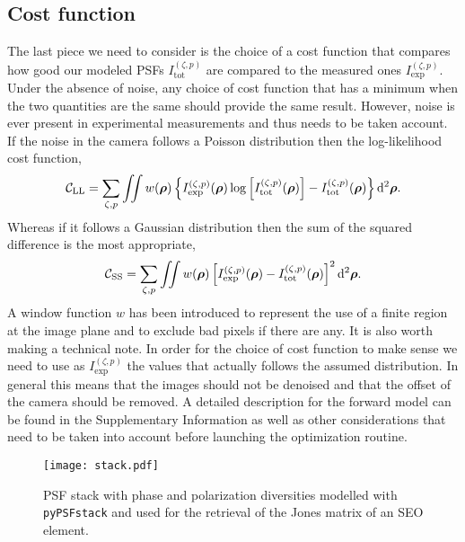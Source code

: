 \documentclass[reprint,aps,pra,superscriptaddress,
amsmath,amssymb]{revtex4-1}
\begin{document}
\subsection{Cost function}

The last piece we need to consider is the choice of a cost function that 
compares how good our modeled PSFs $I^{(\zeta ,p)}_\text{tot}$
are compared to the measured ones $I^{(\zeta ,p)}_\text{exp}$.
Under the absence of noise, any choice of cost function that has a minimum 
when the two quantities are the same should provide the same result. However,
noise is ever present in experimental measurements and thus needs to be taken
account. If the noise in the camera follows a Poisson distribution then the 
log-likelihood cost function,
\begin{align}
  \mathcal{C}_\text{LL} = \sum_{\zeta,p} \iint w(\boldsymbol \rho )\left\{ 
    I^{(\zeta ,p)}_\text{exp} (\boldsymbol \rho )
  \log \left[ I^{(\zeta ,p)}_\text{tot} (\boldsymbol \rho ) \right]
  - I^{(\zeta ,p)}_\text{tot} (\boldsymbol \rho )\right\} \mathrm{d}^2 \boldsymbol \rho.
\end{align}
Whereas if it follows a Gaussian distribution then the sum of the squared 
difference is the most appropriate,
\begin{align}
  \mathcal{C}_\text{SS} = \sum_{\zeta,p} \iint w(\boldsymbol \rho )\left[
    I^{(\zeta ,p)}_\text{exp} (\boldsymbol \rho )
  - I^{(\zeta ,p)}_\text{tot} (\boldsymbol \rho )\right]^2 \mathrm{d}^2 \boldsymbol \rho.
\end{align}
A window function $w$ has been introduced to represent the use of a finite
region at the image plane and to exclude bad pixels if there are any.
It is also worth making a technical note. In order for the choice of cost function 
to make sense we need to use as $I^{(\zeta ,p)}_\text{exp}$ the values that 
actually follows the assumed distribution. In general this means that the images
should not be denoised and that the offset of the camera should be removed.
A detailed description for the forward model can be found in the Supplementary 
Information as well as other considerations that need to be taken into account 
before launching the optimization routine. 

\begin{figure}
  \centering
  \texttt{[image: stack.pdf]}
  \caption{\label{fig:stack} PSF stack with phase and polarization diversities 
  modelled with \texttt{pyPSFstack} and used for the retrieval of the Jones
  matrix of an SEO element. }
\end{figure}
\end{document}
